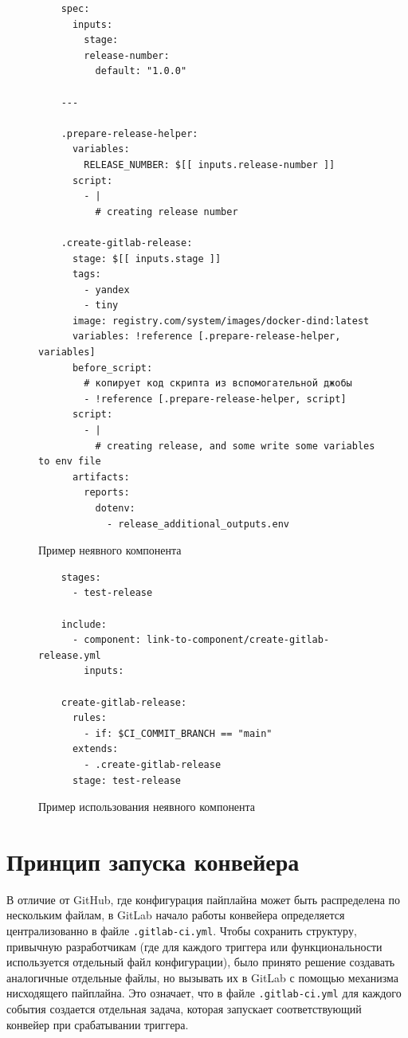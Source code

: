 \begin{figure}
  \centering
  \scriptsize
  \begin{verbatim}
    spec:
      inputs:
        stage:
        release-number:
          default: "1.0.0"

    ---

    .prepare-release-helper:
      variables:
        RELEASE_NUMBER: $[[ inputs.release-number ]]
      script:
        - |
          # creating release number

    .create-gitlab-release:
      stage: $[[ inputs.stage ]]
      tags:
        - yandex
        - tiny
      image: registry.com/system/images/docker-dind:latest
      variables: !reference [.prepare-release-helper, variables]
      before_script:
        # копирует код скрипта из вспомогательной джобы
        - !reference [.prepare-release-helper, script]
      script:
        - |
          # creating release, and some write some variables to env file
      artifacts:
        reports:
          dotenv:
            - release_additional_outputs.env
  \end{verbatim}
  \caption{Пример неявного компонента}
  \label{fig:implicit-component-code}
\end{figure}

\begin{figure}
  \centering
  \scriptsize
  \begin{verbatim}
    stages:
      - test-release

    include:
      - component: link-to-component/create-gitlab-release.yml
        inputs:

    create-gitlab-release:
      rules:
        - if: $CI_COMMIT_BRANCH == "main"
      extends:
        - .create-gitlab-release
      stage: test-release
  \end{verbatim}
  \caption{Пример использования неявного компонента}
  \label{fig:implicit-component-code-usage}
\end{figure}


\section{Принцип запуска конвейера} \label{sec:pipeline-run-principal}
В отличие от GitHub, где конфигурация пайплайна может быть распределена по нескольким файлам,
в GitLab начало работы конвейера определяется централизованно в файле \texttt{.gitlab-ci.yml}.
Чтобы сохранить структуру, привычную разработчикам (где для каждого триггера или функциональности используется отдельный файл конфигурации),
было принято решение создавать аналогичные отдельные файлы,
но вызывать их в GitLab с помощью механизма нисходящего пайплайна.
Это означает, что в файле \texttt{.gitlab-ci.yml} для каждого события создается отдельная задача,
которая запускает соответствующий конвейер при срабатывании триггера.

